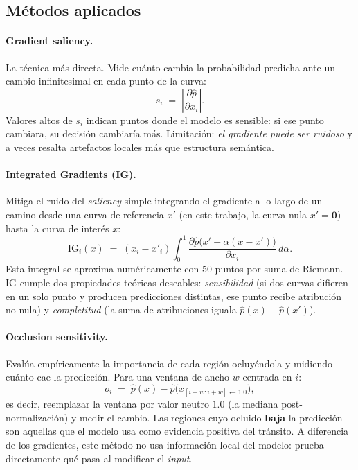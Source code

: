 \documentclass[11pt,a4paper]{article}
\begin{document}
\subsection{Métodos aplicados}
\label{subsec:xai-methods}

\paragraph{Gradient saliency.}
La técnica más directa. Mide cuánto cambia la probabilidad predicha
ante un cambio infinitesimal en cada punto de la curva:
\begin{equation}
s_i \;=\; \left|\dfrac{\partial \hat{p}}{\partial x_i}\right|.
\label{eq:saliency}
\end{equation}
Valores altos de $s_i$ indican puntos donde el modelo es sensible: si
ese punto cambiara, su decisión cambiaría más. Limitación: \textit{el
gradiente puede ser ruidoso} y a veces resalta artefactos locales más
que estructura semántica.

\paragraph{Integrated Gradients (IG).}
Mitiga el ruido del \textit{saliency} simple integrando el gradiente
a lo largo de un camino desde una curva de referencia $x'$ (en este
trabajo, la curva nula $x' = \mathbf{0}$) hasta la curva de interés
$x$:
\begin{equation}
\mathrm{IG}_i(x) \;=\; (x_i - x'_i)\int_0^1
\frac{\partial \hat{p}\bigl(x' + \alpha (x - x')\bigr)}{\partial x_i}\,d\alpha.
\label{eq:ig}
\end{equation}
Esta integral se aproxima numéricamente con 50 puntos por suma de
Riemann. IG cumple dos propiedades teóricas deseables:
\textit{sensibilidad} (si dos curvas difieren en un solo punto y
producen predicciones distintas, ese punto recibe atribución no
nula) y \textit{completitud} (la suma de atribuciones iguala
$\hat{p}(x) - \hat{p}(x')$).

\paragraph{Occlusion sensitivity.}
Evalúa empíricamente la importancia de cada región ocluyéndola y
midiendo cuánto cae la predicción. Para una ventana de ancho $w$
centrada en $i$:
\begin{equation}
o_i \;=\; \hat{p}(x) - \hat{p}\bigl(x_{[i-w:i+w] \leftarrow 1.0}\bigr),
\label{eq:occlusion}
\end{equation}
es decir, reemplazar la ventana por valor neutro $1.0$ (la mediana
post-normalización) y medir el cambio. Las regiones cuyo ocluido
\textbf{baja} la predicción son aquellas que el modelo usa como
evidencia positiva del tránsito. A diferencia de los gradientes, este
método no usa información local del modelo: prueba directamente qué
pasa al modificar el \textit{input}.
\end{document}
